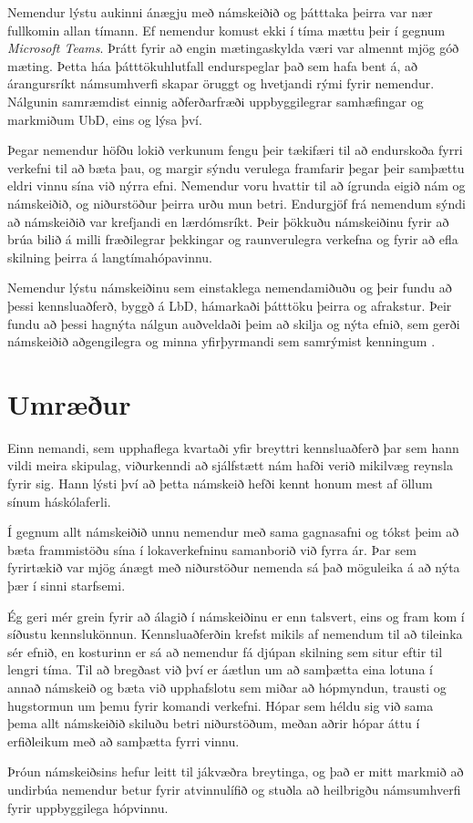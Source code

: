 \documentclass{kennsluakademia_conf}
\begin{document}
Nemendur lýstu aukinni ánægju með námskeiðið og þátttaka þeirra var nær
fullkomin allan tímann. Ef nemendur komust ekki í tíma mættu þeir í
gegnum \emph{Microsoft Teams}. Þrátt fyrir að engin mætingaskylda væri
var almennt mjög góð mæting. Þetta háa þátttökuhlutfall endurspeglar það
sem \citet{freeman2007sense} hafa bent á, að árangursríkt námsumhverfi
skapar öruggt og hvetjandi rými fyrir nemendur. Nálgunin samræmdist
einnig aðferðarfræði uppbyggilegrar samhæfingar og markmiðum UbD, eins
og \citet{biggs_constructive, biggs_university} lýsa því.

Þegar nemendur höfðu lokið verkunum fengu þeir tækifæri til að
endurskoða fyrri verkefni til að bæta þau, og margir sýndu verulega
framfarir þegar þeir samþættu eldri vinnu sína við nýrra efni. Nemendur
voru hvattir til að ígrunda eigið nám og námskeiðið, og niðurstöður
þeirra urðu mun betri. Endurgjöf frá nemendum sýndi að námskeiðið var
krefjandi en lærdómsríkt. Þeir þökkuðu námskeiðinu fyrir að brúa bilið á
milli fræðilegrar þekkingar og raunverulegra verkefna og fyrir að efla
skilning þeirra á langtímahópavinnu.

Nemendur lýstu námskeiðinu sem einstaklega nemendamiðuðu og þeir fundu
að þessi kennsluaðferð, byggð á LbD, hámarkaði þátttöku þeirra og
afrakstur. Þeir fundu að þessi hagnýta nálgun auðveldaði þeim að skilja
og nýta efnið, sem gerði námskeiðið aðgengilegra og minna yfirþyrmandi
sem samrýmist kenningum \citet{kolb1984experiential}.

\section{Umræður}\label{umruxe6uxf0ur}

Einn nemandi, sem upphaflega kvartaði yfir breyttri kennsluaðferð þar
sem hann vildi meira skipulag, viðurkenndi að sjálfstætt nám hafði verið
mikilvæg reynsla fyrir sig. Hann lýsti því að þetta námskeið hefði kennt
honum mest af öllum sínum háskólaferli.

Í gegnum allt námskeiðið unnu nemendur með sama gagnasafni og tókst þeim
að bæta frammistöðu sína í lokaverkefninu samanborið við fyrra ár. Þar
sem fyrirtækið var mjög ánægt með niðurstöður nemenda sá það möguleika á
að nýta þær í sinni starfsemi.

Ég geri mér grein fyrir að álagið í námskeiðinu er enn talsvert, eins og
fram kom í síðustu kennslukönnun. Kennsluaðferðin krefst mikils af
nemendum til að tileinka sér efnið, en kosturinn er sá að nemendur fá
djúpan skilning sem situr eftir til lengri tíma. Til að bregðast við því
er áætlun um að samþætta eina lotuna í annað námskeið og bæta við
upphafslotu sem miðar að hópmyndun, trausti og hugstormun um þemu fyrir
komandi verkefni. Hópar sem héldu sig við sama þema allt námskeiðið
skiluðu betri niðurstöðum, meðan aðrir hópar áttu í erfiðleikum með að
samþætta fyrri vinnu.

Þróun námskeiðsins hefur leitt til jákvæðra breytinga, og það er mitt
markmið að undirbúa nemendur betur fyrir atvinnulífið og stuðla að
heilbrigðu námsumhverfi fyrir uppbyggilega hópvinnu.



\end{document}
